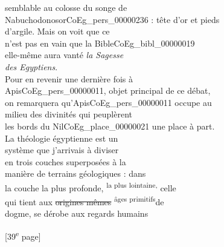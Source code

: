 \documentclass{book}
\begin{document}
{\begin{paracol}{2}
semblable au colosse du songe de\\
Nabuchodonosor\gls{CoEg_pers_00000236} : tête d’or et pieds\\
d’argile. Mais on voit que ce\\
n’est pas en vain que la Bible\gls{CoEg_bibl_00000019}\\
elle-même aura vanté \textit{la Sagesse\\
des Egyptiens}.\\
\indent Pour en revenir une dernière fois à\\
Apis\gls{CoEg_pers_00000011}, objet principal de ce débat,\\
on remarquera qu’Apis\gls{CoEg_pers_00000011} occupe au\\
milieu des divinités qui peuplèrent\\
les bords du Nil\gls{CoEg_place_00000021} une place à part.\\
La théologie égyptienne est un\\
système que j’arrivais à diviser\\
en trois couches superposées à la\\
manière de terrains géologiques : dans\\
la couche la plus profonde, \textsuperscript{la plus lointaine,} celle\\
qui tient aux \sout{origines mêmes} \textsuperscript{âges primitifs}de\\
dogme, se dérobe aux regards humains
\end{paracol}

{\footnotesize\begin{center} {[39\textsuperscript{e} page]}\end{center}}

}
\end{document}
